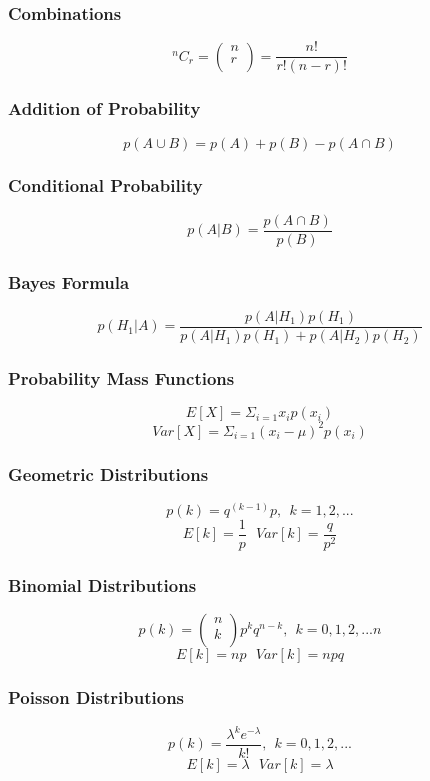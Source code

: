 \documentclass[a4paper,12pt]{article}
\theoremstyle{Qstyle}
\newcommand*{\Comb}[2]{{}^{#1}C_{#2}}%
\begin{document}
	\subsubsection*{Combinations}
	\[\Comb{n}{r}=\left( \begin{array}{c}
	n  \\
	r  \\
	\end{array} \right)=\frac{n!}{r!(n-r)!}\] 
	
	\subsubsection*{Addition of Probability}
	\[p(A\cup B)=p(A)+p(B)-p(A\cap B)\]
	\subsubsection*{Conditional Probability}
	\[p(A|B)=\frac{p(A \cap B)}{p(B)}\]
	\subsubsection*{Bayes Formula}
	\[p(H_1|A)=\frac{p(A|H_1)p(H_1)}{p(A|H_1)p(H_1)+p(A|H_2)p(H_2)}\]
	
	
	\subsubsection*{Probability Mass Functions}
	\[E[X]=\Sigma_{i=1} x_i p(x_i)\]
	\[Var[X]=\Sigma_{i=1} (x_i-\mu)^2 p(x_i)\]
	\subsubsection*{Geometric Distributions}
	\[p(k)=q^{(k-1)}p, \ \ k=1,2,... \]
	\[E[k]=\frac{1}{p} \ \ \ Var[k]=\frac{q}{p^2}\]
	
	\subsubsection*{Binomial Distributions}
	\[p(k)= \left( \begin{array}{c}
	n  \\
	k  \\
	\end{array} \right)p^kq^{n-k}, \ \ k=0,1,2,...n \]
	\[E[k]=np\ \ \ Var[k]=npq\]
	
	\subsubsection*{Poisson Distributions}
	\[p(k)=\frac{\lambda^ke^{-\lambda}}{k!}, \ \ k=0,1,2,... \]
	\[E[k]=\lambda \ \ \ Var[k]=\lambda \]
	
\end{document}
